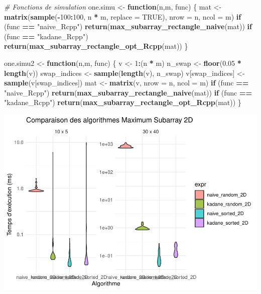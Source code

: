 \documentclass[
]{article}
\newenvironment{Shaded}{\begin{snugshade}}{\end{snugshade}}
\newcommand{\AttributeTok}[1]{\textcolor[rgb]{0.13,0.29,0.53}{#1}}
\newcommand{\CommentTok}[1]{\textcolor[rgb]{0.56,0.35,0.01}{\textit{#1}}}
\newcommand{\ConstantTok}[1]{\textcolor[rgb]{0.56,0.35,0.01}{#1}}
\newcommand{\ControlFlowTok}[1]{\textcolor[rgb]{0.13,0.29,0.53}{\textbf{#1}}}
\newcommand{\DecValTok}[1]{\textcolor[rgb]{0.00,0.00,0.81}{#1}}
\newcommand{\FloatTok}[1]{\textcolor[rgb]{0.00,0.00,0.81}{#1}}
\newcommand{\FunctionTok}[1]{\textcolor[rgb]{0.13,0.29,0.53}{\textbf{#1}}}
\newcommand{\NormalTok}[1]{#1}
\newcommand{\OtherTok}[1]{\textcolor[rgb]{0.56,0.35,0.01}{#1}}
\newcommand{\SpecialCharTok}[1]{\textcolor[rgb]{0.81,0.36,0.00}{\textbf{#1}}}
\newcommand{\StringTok}[1]{\textcolor[rgb]{0.31,0.60,0.02}{#1}}
\begin{document}
\begin{Shaded}
\begin{Highlighting}[]
\CommentTok{\# Fonctions de simulation}
\NormalTok{one.simu }\OtherTok{\textless{}{-}} \ControlFlowTok{function}\NormalTok{(n,m, func) \{}
\NormalTok{  mat }\OtherTok{\textless{}{-}} \FunctionTok{matrix}\NormalTok{(}\FunctionTok{sample}\NormalTok{(}\SpecialCharTok{{-}}\DecValTok{100}\SpecialCharTok{:}\DecValTok{100}\NormalTok{, n }\SpecialCharTok{*}\NormalTok{ m, }\AttributeTok{replace =} \ConstantTok{TRUE}\NormalTok{), }\AttributeTok{nrow =}\NormalTok{ n, }\AttributeTok{ncol =}\NormalTok{ m)}
  \ControlFlowTok{if}\NormalTok{ (func }\SpecialCharTok{==} \StringTok{"naive\_Rcpp"}\NormalTok{) }\FunctionTok{return}\NormalTok{(}\FunctionTok{max\_subarray\_rectangle\_naive}\NormalTok{(mat))}
  \ControlFlowTok{if}\NormalTok{ (func }\SpecialCharTok{==} \StringTok{"kadane\_Rcpp"}\NormalTok{) }\FunctionTok{return}\NormalTok{(}\FunctionTok{max\_subarray\_rectangle\_opt\_Rcpp}\NormalTok{(mat))}
\NormalTok{\}}

\NormalTok{one.simu2 }\OtherTok{\textless{}{-}} \ControlFlowTok{function}\NormalTok{(n,m, func) \{}
\NormalTok{  v }\OtherTok{\textless{}{-}} \DecValTok{1}\SpecialCharTok{:}\NormalTok{(n }\SpecialCharTok{*}\NormalTok{ m)}
\NormalTok{  n\_swap }\OtherTok{\textless{}{-}} \FunctionTok{floor}\NormalTok{(}\FloatTok{0.05} \SpecialCharTok{*} \FunctionTok{length}\NormalTok{(v))}
\NormalTok{  swap\_indices }\OtherTok{\textless{}{-}} \FunctionTok{sample}\NormalTok{(}\FunctionTok{length}\NormalTok{(v), n\_swap)}
\NormalTok{  v[swap\_indices] }\OtherTok{\textless{}{-}} \FunctionTok{sample}\NormalTok{(v[swap\_indices])}
\NormalTok{  mat }\OtherTok{\textless{}{-}} \FunctionTok{matrix}\NormalTok{(v, }\AttributeTok{nrow =}\NormalTok{ n, }\AttributeTok{ncol =}\NormalTok{ m)}
  \ControlFlowTok{if}\NormalTok{ (func }\SpecialCharTok{==} \StringTok{"naive\_Rcpp"}\NormalTok{) }\FunctionTok{return}\NormalTok{(}\FunctionTok{max\_subarray\_rectangle\_naive}\NormalTok{(mat))}
  \ControlFlowTok{if}\NormalTok{ (func }\SpecialCharTok{==} \StringTok{"kadane\_Rcpp"}\NormalTok{) }\FunctionTok{return}\NormalTok{(}\FunctionTok{max\_subarray\_rectangle\_opt\_Rcpp}\NormalTok{(mat))}
\NormalTok{\}}
\end{Highlighting}
\end{Shaded}

\includegraphics{MaxSubarray2D_files/figure-latex/benchmark2-1.pdf}
\end{document}
